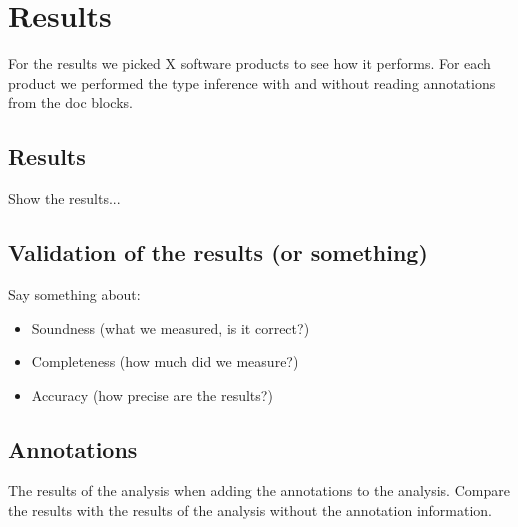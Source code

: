 \documentclass[main.tex]{subfiles}
\begin{document}
    \chapter{Results}\label{ch:results}
    For the results we picked X software products to see how it performs.
    For each product we performed the type inference with and without reading annotations from the doc blocks.
    
    \section{Results}
    Show the results...
    
    \section{Validation of the results (or something)}
    Say something about:
    \begin{itemize}
        \item Soundness (what we measured, is it correct?)
        \item Completeness (how much did we measure?)
        \item Accuracy (how precise are the results?)
    \end{itemize}

    \section{Annotations}
    The results of the analysis when adding the annotations to the analysis. Compare the results with the results of the analysis without the annotation information.
    
\end{document}
